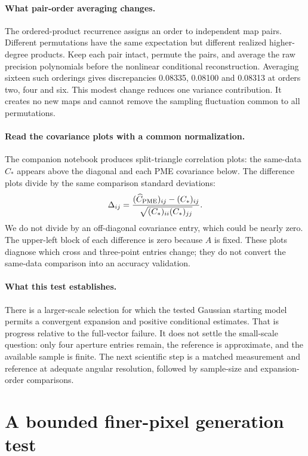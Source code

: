 \documentclass[11pt]{article}
\begin{document}
\paragraph{What pair-order averaging changes.}
The ordered-product recurrence assigns an order to independent map pairs.
Different permutations have the same expectation but different realized
higher-degree products. Keep each pair intact, permute the pairs, and
average the raw precision polynomials before the nonlinear conditional
reconstruction. Averaging sixteen such orderings gives discrepancies
0.08335, 0.08100 and 0.08313 at orders two, four and six. This modest
change reduces one variance contribution. It creates no new maps and
cannot remove the sampling fluctuation common to all permutations.

\paragraph{Read the covariance plots with a common normalization.}
The companion notebook produces split-triangle correlation plots: the
same-data $C_*$ appears above the diagonal and each PME covariance below.
The difference plots divide by the same comparison standard deviations:
\begin{equation}
 \Delta_{ij}=\frac{(\widehat C_{\rm PME})_{ij}-(C_*)_{ij}}
 {\sqrt{(C_*)_{ii}(C_*)_{jj}}}.
\end{equation}
We do not divide by an off-diagonal covariance entry, which could be nearly
zero. The upper-left block of each difference is zero because $A$ is
fixed. These plots diagnose which cross and three-point entries change;
they do not convert the same-data comparison into an accuracy validation.

\paragraph{What this test establishes.}
There is a larger-scale selection for which the tested Gaussian starting
model permits a convergent expansion and positive conditional estimates.
That is progress relative to the full-vector failure. It does not settle
the small-scale question: only four aperture entries remain, the reference
is approximate, and the available sample is finite. The next scientific
step is a matched measurement and reference at adequate angular resolution,
followed by sample-size and expansion-order comparisons.

\section{A bounded finer-pixel generation test}
\end{document}
